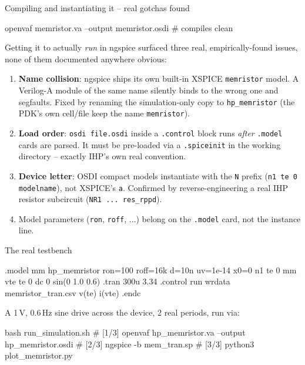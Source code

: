 \documentclass[aspectratio=169]{beamer}
\begin{document}
\begin{frame}[fragile]{Compiling and instantiating it -- real gotchas found}
\begin{cli}
openvaf memristor.va --output memristor.osdi   # compiles clean
\end{cli}
Getting it to actually \emph{run} in ngspice surfaced three real,
empirically-found issues, none of them documented anywhere obvious:
\begin{enumerate}
  \item \textbf{Name collision}: ngspice ships its own built-in XSPICE
        \texttt{memristor} model. A Verilog-A module of the same name
        silently binds to the wrong one and segfaults. Fixed by
        renaming the simulation-only copy to \texttt{hp\_memristor}
        (the PDK's own cell/file keep the name \texttt{memristor}).
  \item \textbf{Load order}: \texttt{osdi file.osdi} inside a
        \texttt{.control} block runs \emph{after} \texttt{.model} cards
        are parsed. It must be pre-loaded via a \texttt{.spiceinit} in
        the working directory -- exactly IHP's own real convention.
  \item \textbf{Device letter}: OSDI compact models instantiate with
        the \texttt{N} prefix (\texttt{n1 te 0 modelname}), not
        XSPICE's \texttt{a}. Confirmed by reverse-engineering a real
        IHP resistor subcircuit (\texttt{NR1 ... res\_rppd}).
  \item Model parameters (\texttt{ron}, \texttt{roff}, ...) belong on
        the \texttt{.model} card, not the instance line.
\end{enumerate}
\end{frame}

\begin{frame}[fragile]{The real testbench}
\begin{va}
.model mm hp_memristor ron=100 roff=16k d=10n uv=1e-14 x0=0
n1 te 0 mm
vte te 0 dc 0 sin(0 1.0 0.6)
.tran 300u 3.34
.control
  run
  wrdata memristor_tran.csv v(te) i(vte)
.endc
\end{va}
A 1\,V, 0.6\,Hz sine drive across the device, 2 real periods, run via:
\begin{cli}
bash run_simulation.sh
# [1/3] openvaf hp_memristor.va --output hp_memristor.osdi
# [2/3] ngspice -b mem_tran.sp
# [3/3] python3 plot_memristor.py
\end{cli}
\end{frame}
\end{document}
